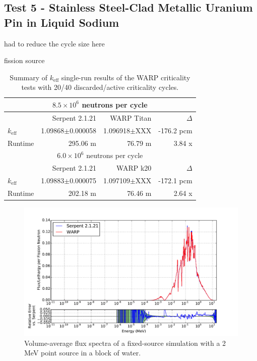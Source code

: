 \documentclass[preprint,12pt]{elsarticle}
\begin{document}
\subsection{Test 5 - Stainless Steel-Clad Metallic Uranium Pin in Liquid Sodium}

had to reduce the cycle size here


fission source

\begin{table}[h]
\centering
\caption{Summary of $k_\mathrm{eff}$ single-run results of the WARP criticality tests with 20/40 discarded/active criticality cycles.}
\label{sodiumpin_table}
\small
\begin{tabular}{| l | r | r | r |}
\hline
\multicolumn{4}{|c|}{$8.5\times10^6$ neutrons per cycle} \\
\hline
                  & Serpent 2.1.21       & WARP Titan              & $\Delta$ \\
\hline
$k_\mathrm{eff}$  & 1.09868$\pm$0.000058 & 1.096918$\pm$XXX        & -176.2 pcm \\
\hline
Runtime           & 295.06 m             & 76.79 m                 & 3.84 x \\
\hline
\hline
\multicolumn{4}{|c|}{$6.0\times10^6$ neutrons per cycle} \\
\hline
                  & Serpent 2.1.21       & WARP k20            & $\Delta$ \\
\hline
$k_\mathrm{eff}$  & 1.09883$\pm$0.000075 & 1.097109$\pm$XXX    & -172.1 pcm \\
\hline
Runtime           & 202.18 m             & 76.46 m             & 2.64 x\\
\hline
\end{tabular}
\end{table}

\begin{figure}[h!]
\centering
\includegraphics[width=\textwidth,trim= 1cm 0cm 1cm 0cm]{graphics/sodiumpin_spec.pdf}
\caption{Volume-average flux spectra of a fixed-source simulation with a 2 MeV point source in a block of water. \label{sodiumpin_spec} }
\end{figure}
\end{document}
